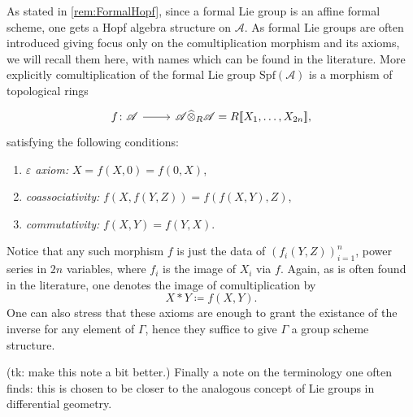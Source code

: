 \documentclass[../Main]{subfiles}
\begin{document}
\begin{rem}[]
	As stated in \cref{rem:FormalHopf}, since a formal Lie group
	is an affine formal scheme, one gets a Hopf algebra structure
	on $\mathscr{A}$.
	As formal Lie groups are often introduced giving focus only
	on the comultiplication morphism and its axioms, we will
	recall them here, with names which can be found in the literature.
	More explicitly comultiplication of the formal Lie group
	$\mathrm{Spf}(\mathscr{A})$ is a morphism of topological rings
	\begin{equation*}
	\begin{tikzcd}[row sep = 0ex
		,/tikz/column 1/.append style={anchor=base east}
		,/tikz/column 2/.append style={anchor=base west}]
		f\colon \mathscr{A} \arrow[r, "", rightarrow] &
		\mathscr{A} \widehat{\otimes}_R \mathscr{A} =
		R [\![ X_1, \ldots, X_{ 2n } ]\!]
	,\end{tikzcd}
	\end{equation*} 
	satisfying the following conditions:
	\begin{enumerate}
		\item {\em $\varepsilon$ axiom:} $X = f(X,0) = f(0,X)$,
		\item {\em coassociativity:} $f(X, f(Y,Z)) = f(f(X,Y), Z)$,
		\item {\em commutativity:} $f(X,Y) = f(Y,X)$.
	\end{enumerate}
	Notice that any such morphism $f$ is just the data of 
	$\left( f_i(Y,Z) \right)_{i=1}^n$, power series in $2n$ variables, where
	$f_i$ is the image of $X_i$ via $f$.
	Again, as is often found in the literature, one denotes the image of
	comultiplication by
	\begin{equation*}
		X \ast Y \coloneqq f(X,Y)
	.\end{equation*} 
	One can also stress that these axioms are enough to grant
	the existance of the inverse for any element of $\Gamma$,
	hence they suffice to give $\Gamma$ a group scheme structure.

	(tk: make this note a bit better.)
	Finally a note on the terminology one often finds: this
	is chosen to be closer to the analogous concept of Lie groups
	in differential geometry.
\end{rem}
\end{document}
